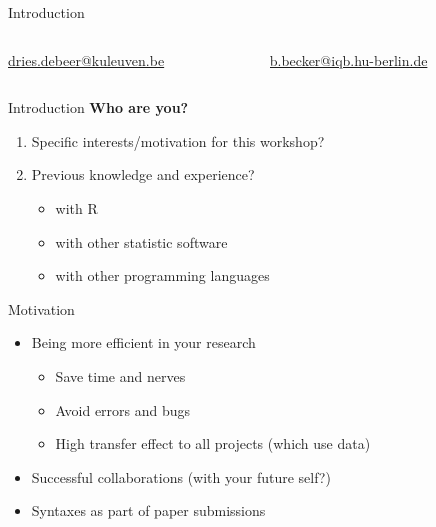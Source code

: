 \documentclass[xcolor=table]{beamer}\usepackage[]{graphicx}\usepackage[]{color}
\begin{document}
\begin{frame}{Introduction}
\begin{columns}[t]
\begin{column}{.475\textwidth}

\href{mailto:dries.debeer@kuleuven.be}{dries.debeer@kuleuven.be}
  	
\end{column}
  \begin{column}{.475\textwidth}

\href{b.becker@iqb.hu-berlin.de}{b.becker@iqb.hu-berlin.de}

  \end{column}
\end{columns}

\vspace{1.5em}
\end{frame}

\begin{frame}{Introduction}
\textbf{Who are you?}
\begin{enumerate}%
	\item Specific interests/motivation for this workshop?
	\item Previous knowledge and experience?
	\begin{itemize}
	  \item with R
	  \item with other statistic software
	  \item with other programming languages
	\end{itemize}
\end{enumerate}
\end{frame}

\begin{frame}{Motivation}
	\begin{itemize}
			\item Being more efficient in your research
			\begin{itemize}
			  \item Save time and nerves
			  \item Avoid errors and bugs
			  \item High transfer effect to all projects (which use data)
			\end{itemize}
			\item Successful collaborations (with your future self?)
			\item Syntaxes as part of paper submissions
	\end{itemize}
\end{frame}
\end{document}
